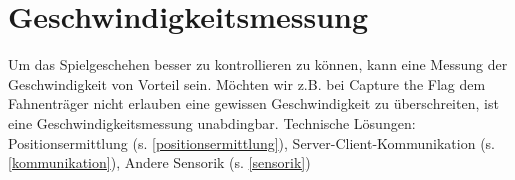 \section{Geschwindigkeitsmessung}
Um das Spielgeschehen besser zu kontrollieren zu können, kann eine Messung der
Geschwindigkeit von Vorteil sein. Möchten wir z.B. bei Capture the Flag dem Fahnenträger
nicht erlauben eine gewissen Geschwindigkeit zu überschreiten, ist eine
Geschwindigkeitsmessung unabdingbar.
\newline
Technische Lösungen:
Positionsermittlung (s. \ref{positionsermittlung}), Server-Client-Kommunikation (s. \ref{kommunikation}), Andere Sensorik (s. \ref{sensorik})
